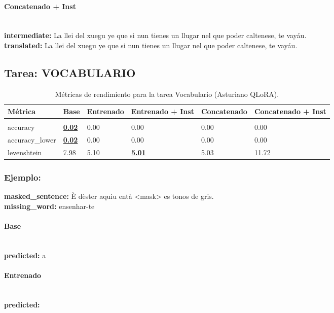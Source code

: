 \paragraph{Concatenado + Inst}~\\
\textbf{intermediate:} La llei del xuegu ye que si nun tienes un llugar nel que poder caltenese, te vayáu.\\
\textbf{translated:} La llei del xuegu ye que si nun tienes un llugar nel que poder caltenese, te vayáu.\\

\subsection{Tarea: VOCABULARIO}\label{tarea-vocabulario}
\begin{longtable}[]{@{}llllll@{}}
\toprule\noalign{}
Métrica & Base & Entrenado & Entrenado + Inst & Concatenado & Concatenado + Inst \\
\midrule\noalign{}
\endhead
\bottomrule\noalign{}
\caption{Métricas de rendimiento para la tarea Vocabulario (Asturiano QLoRA).}
\label{tab:metricas_vocabulario_Asturiano QLoRA}}\\
\endlastfoot
accuracy & \textbf{\underline{0.02}} & 0.00 & 0.00 & 0.00 & 0.00 \\
accuracy\_lower & \textbf{\underline{0.02}} & 0.00 & 0.00 & 0.00 & 0.00 \\
levenshtein & 7.98 & 5.10 & \textbf{\underline{5.01}} & 5.03 & 11.72 \\
\end{longtable}

\subsubsection{Ejemplo:}
\textbf{masked\_sentence:} È d\textquotesingle{}èster aquiu entà {\textless}mask{\textgreater} es tonos de gris.\\
\textbf{missing\_word:} ensenhar-te\\

\paragraph{Base}~\\
\textbf{predicted:} a\\

\paragraph{Entrenado}~\\
\textbf{predicted:} \\

